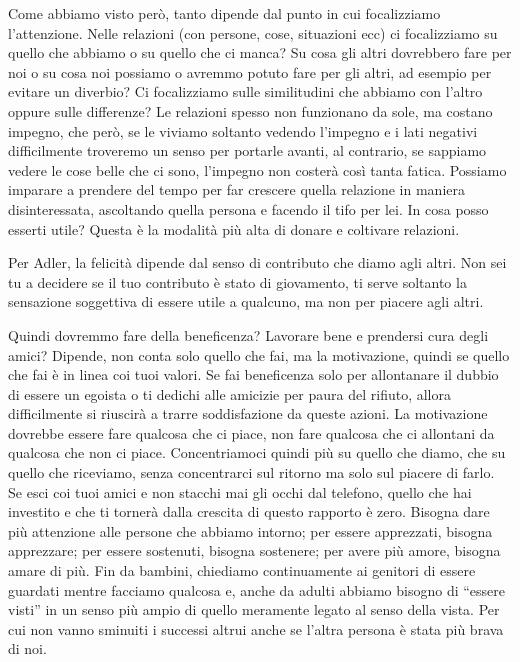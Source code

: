 \documentclass[12pt]{book} %
\begin{document}
Come abbiamo visto però, tanto dipende dal punto in cui focalizziamo l'attenzione. Nelle relazioni
(con persone, cose, situazioni ecc) ci focalizziamo su quello che abbiamo o su quello che ci manca? Su cosa gli altri
dovrebbero fare per noi o su cosa noi possiamo o avremmo potuto fare per gli altri, ad esempio per evitare un diverbio?
Ci focalizziamo sulle similitudini che abbiamo con l'altro oppure sulle differenze? Le relazioni spesso non funzionano
da sole, ma costano impegno, che però, se le viviamo soltanto vedendo l'impegno e i lati negativi
difficilmente troveremo un senso per portarle avanti, al contrario, se sappiamo vedere le cose belle che ci sono,
l'impegno non costerà così tanta fatica. Possiamo imparare a prendere del tempo per far crescere
quella relazione in maniera disinteressata, ascoltando quella persona e facendo il tifo per lei. In cosa posso esserti
utile? Questa è la modalità più alta di donare e coltivare relazioni.


\bigskip

Per Adler, la felicità dipende dal senso di contributo che diamo agli altri. Non sei tu a decidere se il tuo contributo
è stato di giovamento, ti serve soltanto la sensazione soggettiva di essere utile a qualcuno, ma non per piacere agli
altri.


\bigskip

Quindi dovremmo fare della beneficenza? Lavorare bene e prendersi cura degli amici? Dipende, non conta solo quello che
fai, ma la motivazione, quindi se quello che fai è in linea coi tuoi valori. Se fai beneficenza solo per allontanare il
dubbio di essere un egoista o ti dedichi alle amicizie per paura del rifiuto, allora difficilmente si riuscirà a trarre
soddisfazione da queste azioni. La motivazione dovrebbe essere fare qualcosa che ci piace, non fare qualcosa che ci
allontani da qualcosa che non ci piace. Concentriamoci quindi più su quello che diamo, che su quello che riceviamo,
senza concentrarci sul ritorno ma solo sul piacere di farlo. Se esci coi tuoi amici e non stacchi mai gli occhi dal
telefono, quello che hai investito e che ti tornerà dalla crescita di questo rapporto è zero. Bisogna dare più
attenzione alle persone che abbiamo intorno; per essere apprezzati, bisogna apprezzare; per essere sostenuti, bisogna
sostenere; per avere più amore, bisogna amare di più. Fin da bambini, chiediamo continuamente ai genitori di essere
guardati mentre facciamo qualcosa e, anche da adulti abbiamo bisogno di “essere visti” in un senso più ampio di quello
meramente legato al senso della vista. Per cui non vanno sminuiti i successi altrui anche se l'altra persona è stata
più brava di noi.
\end{document}
